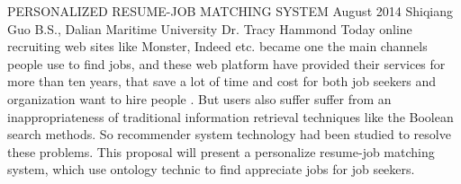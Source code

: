 \begingroup
\absone
{PERSONALIZED RESUME-JOB MATCHING SYSTEM}
{August 2014}
{Shiqiang Guo}
{B.S., Dalian Maritime University}  %
{Dr. Tracy Hammond}%
{
Today online recruiting web sites like Monster, Indeed etc. became one the main channels people use to find jobs, and these web platform  have provided their services for more than ten years, that save a lot of time and cost for both job seekers and organization want to hire people . But users also suffer suffer  from  an inappropriateness  of  traditional  information  retrieval  techniques  like  the  Boolean  search  methods. So recommender system technology had been studied to resolve these problems.  This  proposal will  present  a  personalize resume-job matching system, which use ontology technic to find appreciate jobs for job seekers.
}
\endgroup



